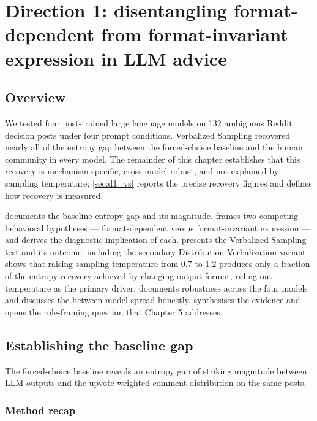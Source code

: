 \chapter{Direction 1: disentangling format-dependent from format-invariant expression in LLM advice}
\label{chap:direction1}

\section{Overview}
\label{sec:d1_overview}

We tested four post-trained large language models on 132 ambiguous
Reddit decision posts under four prompt conditions. Verbalized Sampling
recovered nearly all of the entropy gap between the forced-choice
baseline and the human community in every model. The remainder of this
chapter establishes that this recovery is mechanism-specific,
cross-model robust, and not explained by sampling temperature;
\cref{sec:d1_vs} reports the precise recovery figures and defines how
recovery is measured.

 documents the baseline entropy gap and its
magnitude.  frames two competing behavioral
hypotheses — format-dependent versus format-invariant expression — and
derives the diagnostic implication of each.  presents the Verbalized
Sampling test and its outcome, including the secondary Distribution
Verbalization variant.  shows that raising
sampling temperature from 0.7 to 1.2 produces only a fraction of the
entropy recovery achieved by changing output format, ruling out
temperature as the primary driver.  documents
robustness across the four models and discusses the between-model spread
honestly.  synthesises the evidence and opens the
role-framing question that Chapter 5 addresses.

\section{Establishing the baseline gap}
\label{sec:d1_baseline}

The forced-choice baseline reveals an entropy gap of striking magnitude
between LLM outputs and the upvote-weighted comment distribution on the
same posts.

\subsection*{Method recap}
\label{subsec:d1_method}

